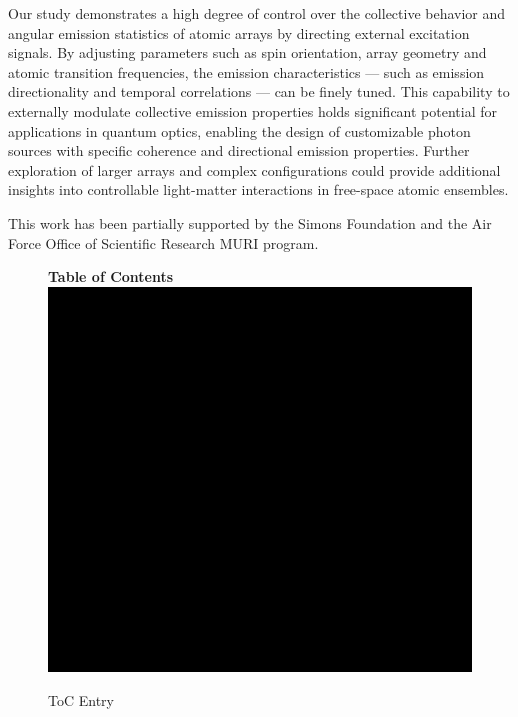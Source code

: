\documentclass[aps,prl,twocolumn,superscriptaddress,showpacs,amsmath,amssymb]{revtex4-2}
\begin{document}
Our study demonstrates a high degree of control over the collective behavior and angular emission statistics of atomic arrays by directing external excitation signals.
By adjusting parameters such as spin orientation, array geometry and atomic transition frequencies, the emission characteristics --- such as emission directionality and temporal correlations --- can be finely tuned.
This capability to externally modulate collective emission properties holds significant potential for applications in quantum optics, enabling the design of customizable photon sources with specific coherence and directional emission properties.
Further exploration of larger arrays and complex configurations could provide additional insights into controllable light-matter interactions in free-space atomic ensembles.



\begin{acknowledgments}
This work has been partially supported by the Simons Foundation and the Air Force Office of Scientific Research MURI program.
\end{acknowledgments}




\begin{figure}
\textbf{Table of Contents}\\
\medskip
  \includegraphics{toc-image}
  \medskip
  \caption*{ToC Entry}
\end{figure}
\end{document}
